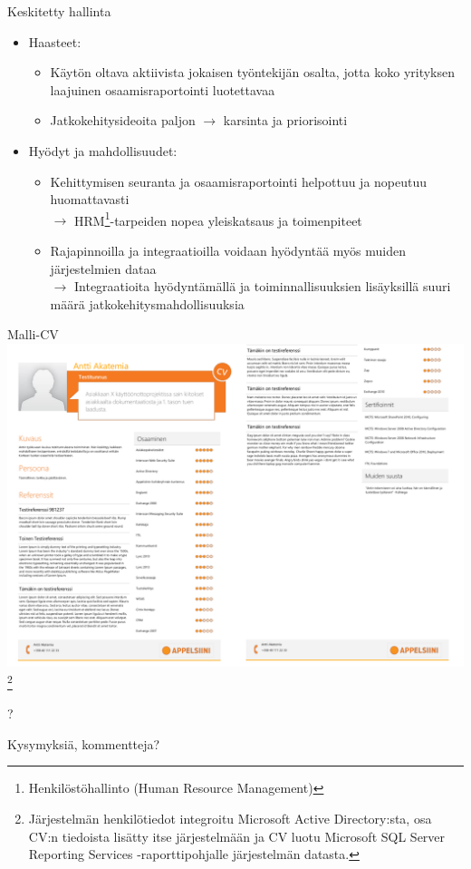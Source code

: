 \documentclass[first=purple,second=dblue,logo=redquo]{aaltoslides}
\newcommand\blfootnote[1]{%
  \begingroup
  \renewcommand\thefootnote{}\footnote{#1}%
  \addtocounter{footnote}{-1}%
  \endgroup
}
\begin{document}
\begin{frame}{Keskitetty hallinta}
\begin{itemize}
\item Haasteet:
\begin{itemize}
\item Käytön oltava aktiivista jokaisen työntekijän osalta, jotta koko yrityksen laajuinen osaamisraportointi luotettavaa
\item Jatkokehitysideoita paljon $\rightarrow$ karsinta ja priorisointi
\end{itemize}
\item Hyödyt ja mahdollisuudet:
\begin{itemize}
\item Kehittymisen seuranta ja osaamisraportointi helpottuu ja nopeutuu huomattavasti \\ $\rightarrow$ HRM\footnote{\tiny{Henkilöstöhallinto (Human Resource Management)}}-tarpeiden nopea yleiskatsaus ja toimenpiteet
\item Rajapinnoilla ja integraatioilla voidaan hyödyntää myös muiden järjestelmien dataa \\ $\rightarrow$ Integraatioita hyödyntämällä ja toiminnallisuuksien lisäyksillä suuri määrä jatkokehitysmahdollisuuksia
\end{itemize}
\end{itemize}
\end{frame}
{
\begin{frame}{Malli-CV}
\includegraphics[width=\textwidth]{Akatemia_sampleCV.png} \blfootnote{\tiny{Järjestelmän henkilötiedot integroitu Microsoft Active Directory:sta, osa CV:n tiedoista lisätty itse järjestelmään ja CV luotu Microsoft SQL Server Reporting Services -raporttipohjalle järjestelmän datasta.}}
\end{frame}
\begin{frame}{?}
\begin{center}
Kysymyksiä, kommentteja?
\end{center}
\end{frame}
}
\end{document}
